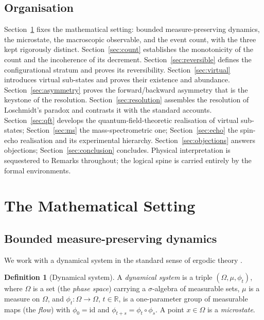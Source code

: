 \documentclass[11pt,a4paper]{article}
\theoremstyle{thmstyle}
\theoremstyle{definition}
\newtheorem{definition}[theorem]{Definition}
\theoremstyle{remark}
\newcommand{\R}{\mathbb{R}}
\newcommand{\flow}{\phi}
\begin{document}
\subsection{Organisation}
\label{sec:organisation}

Section~\ref{sec:setup} fixes the mathematical setting: bounded
measure-preserving dynamics, the microstate, the macroscopic observable,
and the event count, with the three kept rigorously distinct.
Section~\ref{sec:count} establishes the monotonicity of the count and the
incoherence of its decrement. Section~\ref{sec:reversible} defines the
configurational stratum and proves its reversibility.
Section~\ref{sec:virtual} introduces virtual sub-states and proves their
existence and abundance. Section~\ref{sec:asymmetry} proves the
forward/backward asymmetry that is the keystone of the resolution.
Section~\ref{sec:resolution} assembles the resolution of Loschmidt's
paradox and contrasts it with the standard accounts.
Section~\ref{sec:qft} develops the quantum-field-theoretic realisation of
virtual sub-states; Section~\ref{sec:ms} the mass-spectrometric one;
Section~\ref{sec:echo} the spin-echo realisation and its experimental
hierarchy. Section~\ref{sec:objections} answers objections;
Section~\ref{sec:conclusion} concludes. Physical interpretation is
sequestered to Remarks throughout; the logical spine is carried entirely
by the formal environments.

\section{The Mathematical Setting}
\label{sec:setup}

\subsection{Bounded measure-preserving dynamics}
\label{sec:bounded}

We work with a dynamical system in the standard sense of ergodic theory
\citep{walters1982,arnold1989}.

\begin{definition}[Dynamical system]
\label{def:system}
A \emph{dynamical system} is a triple $(\Omega,\mu,\flow_t)$, where
$\Omega$ is a set (the \emph{phase space}) carrying a $\sigma$-algebra of
measurable sets, $\mu$ is a measure on $\Omega$, and
$\flow_t\colon\Omega\to\Omega$, $t\in\R$, is a one-parameter group of
measurable maps (the \emph{flow}) with $\flow_0=\mathrm{id}$ and
$\flow_{t+s}=\flow_t\circ\flow_s$. A point $x\in\Omega$ is a
\emph{microstate}.
\end{definition}
\end{document}
